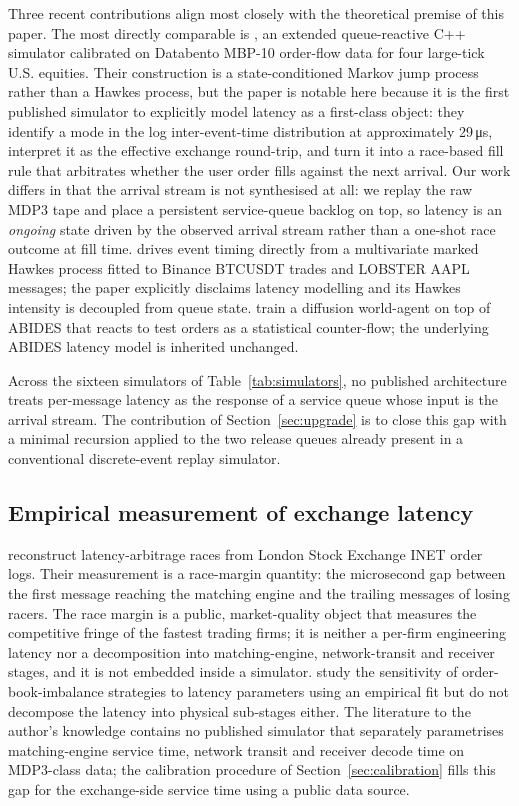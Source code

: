 \documentclass[11pt]{article}
\begin{document}
Three recent contributions align most closely with the theoretical premise of this paper. The most directly comparable is \citet{noble2026reality}, an extended queue-reactive C++ simulator calibrated on Databento MBP-10 order-flow data for four large-tick U.S. equities. Their construction is a state-conditioned Markov jump process rather than a Hawkes process, but the paper is notable here because it is the first published simulator to explicitly model latency as a first-class object: they identify a mode in the log inter-event-time distribution at approximately 29\,\si{\micro\second}, interpret it as the effective exchange round-trip, and turn it into a race-based fill rule that arbitrates whether the user order fills against the next arrival. Our work differs in that the arrival stream is not synthesised at all: we replay the raw MDP3 tape and place a persistent service-queue backlog on top, so latency is an \emph{ongoing} state driven by the observed arrival stream rather than a one-shot race outcome at fill time. \citet{elkarmi2025hawkeslob} drives event timing directly from a multivariate marked Hawkes process fitted to Binance BTCUSDT trades and LOBSTER AAPL messages; the paper explicitly disclaims latency modelling and its Hawkes intensity is decoupled from queue state. \citet{berti2025deepmarket} train a diffusion world-agent on top of ABIDES that reacts to test orders as a statistical counter-flow; the underlying ABIDES latency model is inherited unchanged.

Across the sixteen simulators of Table~\ref{tab:simulators}, no published architecture treats per-message latency as the response of a service queue whose input is the arrival stream. The contribution of Section~\ref{sec:upgrade} is to close this gap with a minimal recursion applied to the two release queues already present in a conventional discrete-event replay simulator.

\subsection{Empirical measurement of exchange latency}
\label{sec:related-empirical}

\citet{aquilina2022arms} reconstruct latency-arbitrage races from London Stock Exchange INET order logs. Their measurement is a race-margin quantity: the microsecond gap between the first message reaching the matching engine and the trailing messages of losing racers. The race margin is a public, market-quality object that measures the competitive fringe of the fastest trading firms; it is neither a per-firm engineering latency nor a decomposition into matching-engine, network-transit and receiver stages, and it is not embedded inside a simulator. \citet{stoikov2020imbalance} study the sensitivity of order-book-imbalance strategies to latency parameters using an empirical fit but do not decompose the latency into physical sub-stages either. The literature to the author's knowledge contains no published simulator that separately parametrises matching-engine service time, network transit and receiver decode time on MDP3-class data; the calibration procedure of Section~\ref{sec:calibration} fills this gap for the exchange-side service time using a public data source.
\end{document}
